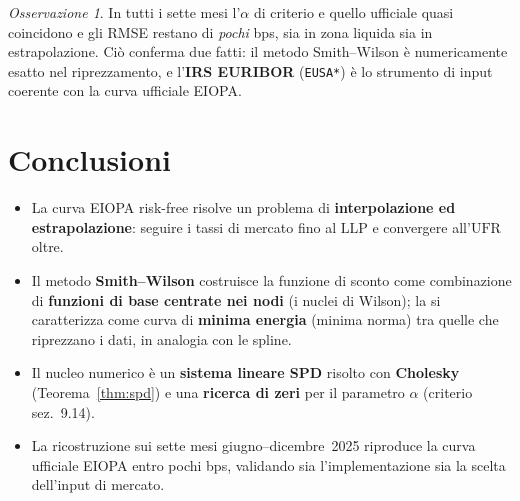 \documentclass[11pt,a4paper]{article}
\theoremstyle{plain}
\theoremstyle{definition}
\theoremstyle{remark}
\newtheorem*{osservazione}{Osservazione}
\newcommand{\UFR}{\ensuremath{\mathrm{UFR}}}
\newcommand{\LLP}{\ensuremath{\mathrm{LLP}}}
\begin{document}
\begin{osservazione}
In tutti i sette mesi l'$\alpha$ di criterio e quello ufficiale quasi coincidono e gli RMSE
restano di \emph{pochi} bps, sia in zona liquida sia in estrapolazione. Ci\`o conferma due
fatti: il metodo Smith--Wilson \`e numericamente esatto nel riprezzamento, e l'\textbf{IRS
EURIBOR} (\texttt{EUSA*}) \`e lo strumento di input coerente con la curva ufficiale EIOPA.
\end{osservazione}

\section{Conclusioni}

\begin{itemize}
  \item La curva EIOPA risk-free risolve un problema di \textbf{interpolazione ed
        estrapolazione}: seguire i tassi di mercato fino al $\LLP$ e convergere all'$\UFR$ oltre.
  \item Il metodo \textbf{Smith--Wilson} costruisce la funzione di sconto come combinazione di
        \textbf{funzioni di base centrate nei nodi} (i nuclei di Wilson); la si caratterizza come curva di \textbf{minima energia}
        (minima norma) tra quelle che riprezzano i dati, in analogia con le spline.
  \item Il nucleo numerico \`e un \textbf{sistema lineare SPD} risolto con \textbf{Cholesky}
        (Teorema~\ref{thm:spd}) e una \textbf{ricerca di zeri} per il parametro $\alpha$
        (criterio sez.~9.14).
  \item La ricostruzione sui sette mesi giugno--dicembre~2025 riproduce la curva ufficiale EIOPA
        entro pochi bps, validando sia l'implementazione sia la scelta dell'input di mercato.
\end{itemize}
\end{document}
